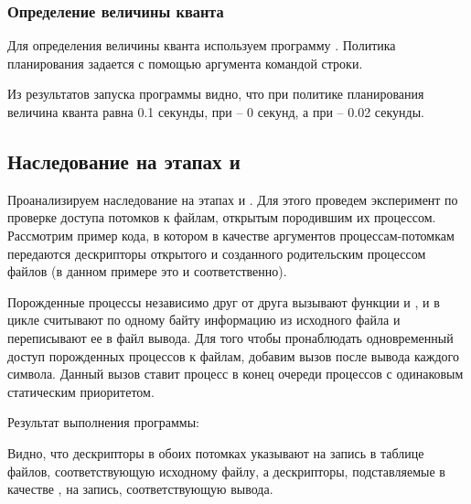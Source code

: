\subsubsection{Определение величины кванта}

Для определения величины кванта используем программу . Политика планирования задается с помощью аргумента командой строки.



Из результатов запуска программы видно, что при политике планирования  величина кванта равна 0.1 секунды, при  -- 0 секунд, а при  -- 0.02 секунды.



\subsection{Наследование на этапах  и }

Проанализируем наследование на этапах  и . Для этого проведем эксперимент по проверке доступа потомков к файлам, открытым породившим их процессом. Рассмотрим пример кода, в котором в качестве аргументов процессам-потомкам передаются дескрипторы открытого и созданного родительским процессом файлов (в данном примере это  и  соответственно).

Порожденные процессы независимо друг от друга вызывают функции  и , и в цикле считывают по одному байту информацию из исходного файла и переписывают ее в файл вывода. Для того чтобы пронаблюдать одновременный доступ порожденных процессов к файлам, добавим вызов  после вывода каждого символа. Данный вызов ставит процесс в конец очереди процессов с одинаковым статическим приоритетом.





Результат выполнения программы:



Видно, что дескрипторы  в обоих потомках указывают на запись в таблице файлов, соответствующую исходному файлу, а дескрипторы, подставляемые в качестве , на запись, соответствующую  вывода.

